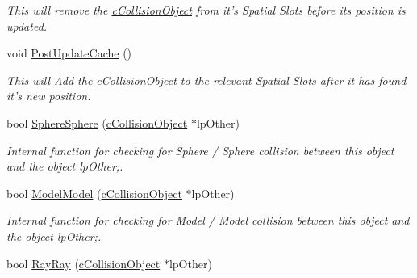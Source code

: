 \begin{DoxyCompactItemize}
\begin{DoxyCompactList}\small\item\em This will remove the \hyperlink{classc_collision_object}{cCollisionObject} from it's Spatial Slots before its position is updated. \end{DoxyCompactList}\item 
\hypertarget{classc_collision_object_a7719840f3fcc5bf3dcef08d123066739}{
void \hyperlink{classc_collision_object_a7719840f3fcc5bf3dcef08d123066739}{PostUpdateCache} ()}
\label{classc_collision_object_a7719840f3fcc5bf3dcef08d123066739}

\begin{DoxyCompactList}\small\item\em This will Add the \hyperlink{classc_collision_object}{cCollisionObject} to the relevant Spatial Slots after it has found it's new position. \end{DoxyCompactList}\item 
\hypertarget{classc_collision_object_a53623f53b0ac497bfa1c794a76d2f818}{
bool \hyperlink{classc_collision_object_a53623f53b0ac497bfa1c794a76d2f818}{SphereSphere} (\hyperlink{classc_collision_object}{cCollisionObject} $\ast$lpOther)}
\label{classc_collision_object_a53623f53b0ac497bfa1c794a76d2f818}

\begin{DoxyCompactList}\small\item\em Internal function for checking for Sphere / Sphere collision between this object and the object lpOther;. \end{DoxyCompactList}\item 
\hypertarget{classc_collision_object_ae87264d7ecd143a67244c95b10c07ab7}{
bool \hyperlink{classc_collision_object_ae87264d7ecd143a67244c95b10c07ab7}{ModelModel} (\hyperlink{classc_collision_object}{cCollisionObject} $\ast$lpOther)}
\label{classc_collision_object_ae87264d7ecd143a67244c95b10c07ab7}

\begin{DoxyCompactList}\small\item\em Internal function for checking for Model / Model collision between this object and the object lpOther;. \end{DoxyCompactList}\item 
\hypertarget{classc_collision_object_aa4500b5834736e5abeabe71c300e64e8}{
bool \hyperlink{classc_collision_object_aa4500b5834736e5abeabe71c300e64e8}{RayRay} (\hyperlink{classc_collision_object}{cCollisionObject} $\ast$lpOther)}
\label{classc_collision_object_aa4500b5834736e5abeabe71c300e64e8}


\end{DoxyCompactItemize}
